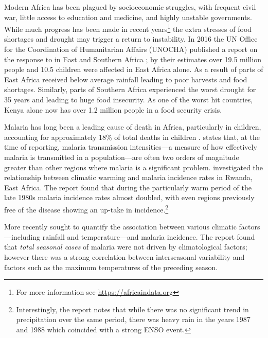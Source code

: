 Modern Africa has been plagued by socioeconomic struggles, with frequent civil
war, little access to education and medicine, and highly unstable
governments. While much progress has been made in recent years\footnote{For more
  information see \url{https://africaindata.org}} the extra stresses of food
shortages and drought may trigger a return to instability.
In 2016 the UN Office for the Coordination of Humanitarian Affairs (UNOCHA)
published a report on the response to \elnino{} in East and Southern Africa
\citep{unocha2016}; by their estimates over 19.5 million people and 10.5
children were affected in East Africa alone. As a result of \elnino{} parts of
East Africa received below average rainfall leading to poor harvests and food
shortages. Similarly, parts of Southern Africa experienced the worst drought for
35 years and leading to huge food insecurity. As one of the worst hit countries,
Kenya alone now has over 1.2 million people in a food security crisis.

Malaria has long been a leading cause of death in Africa, particularly in
children, accounting for approximately 18\% of total deaths in children
\citep{IMHE2016}. \citet{Alles1998} states that, at the time of reporting,
malaria transmission intensities---a measure of how effectively malaria is
transmitted in a population---are often two orders of magnitude greater than other
regions where malaria is a significant problem. \citet{loevinsohn1994}
investigated the relationship between climatic warming and malaria incidence
rates in Rwanda, East Africa. The report found that during the particularly warm
period of the late 1980s malaria incidence rates almost doubled, with even
regions previously free of the disease showing an up-take in
incidence.\footnote{Interestingly, the report notes that while there was no
  significant trend in precipitation over the same period, there was heavy rain
  in the years 1987 and 1988 which coincided with a strong ENSO event.}

More recently \cite{craig2004} sought to quantify the association between
various climatic factors---including rainfall and temperature---and malaria
incidence. The report found that \emph{total seasonal cases} of malaria were not
driven by climatological factors; however there was a strong correlation between
interseasonal variability and factors such as the maximum temperatures of the
preceding season.



